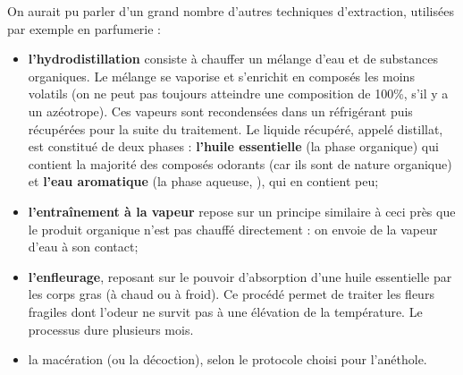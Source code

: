 \documentclass[11pt,a4paper]{report}
\begin{document}
On aurait pu parler d'un grand nombre d'autres techniques d'extraction, utilisées par exemple en parfumerie :
\begin{itemize}
	\item \textbf{l'hydrodistillation} consiste à chauffer un mélange d'eau et de substances 					organiques. Le mélange se vaporise et s'enrichit en composés les moins volatils (on ne peut pas 		toujours atteindre une composition de 100\%, s'il y a un azéotrope). Ces vapeurs sont 					recondensées dans un réfrigérant puis récupérées pour la suite du traitement. Le liquide 				récupéré, appelé distillat, est constitué de deux phases : \textbf{l'huile essentielle} (la 			phase organique) qui contient la majorité des composés odorants (car ils sont de nature 				organique) et \textbf{l'eau aromatique} (la phase aqueuse, ), qui en contient peu;\\
	\item \textbf{l'entraînement à la vapeur} repose sur un principe similaire à ceci près que le 				produit organique n'est pas chauffé directement : on envoie de la vapeur d'eau à son contact;\\
	\item \textbf{l'enfleurage}, reposant sur le pouvoir d'absorption d'une huile essentielle par les 			corps gras (à chaud ou à froid). Ce procédé permet de traiter les fleurs fragiles dont l'odeur 			ne survit pas à une élévation de la température. Le processus dure plusieurs mois.\\
	\item la macération (ou la décoction), selon le protocole choisi pour l'anéthole.
\end{itemize}
\end{document}
